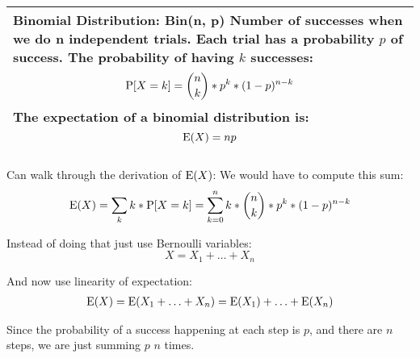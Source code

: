 {\tabulinesep=1mm
\begin{tabu}{|p{16cm} |}
\hline
\vspace{2 mm}
\textbf{Binomial Distribution: Bin(n, p)}
Number of successes when we do n independent trials. Each trial has a 
probability $p$ of success. The probability of having $k$ successes:
\[ \P[X = k] = {n \choose k} * p^k * (1 - p)^{n - k}  \]
The expectation of a binomial distribution is:
\[ \E(X) = np \]
\\
\hline
\end{tabu}
}

\begin{solution} %
Can walk through the derivation of $\E(X)$: 
We would have to compute this sum:
\[\E(X) = \sum_{k} k * \P[X = k] = \sum_{k = 0}^{n} k * {n \choose k} * 
p^k * (1 - p)^{n - k} \]

Instead of doing that just use Bernoulli variables:
\[ X = X_1 + \dotsc + X_n \]

And now use linearity of expectation:
\begin{equation}
\begin{split}
\E(X) = \E(X_1 + \dotsc + X_n) = \E(X_1) + \dotsc + \E(X_n) \nonumber
\end{split}
\end{equation}

Since the probability of a success happening at each step is $p$, and 
there are $n$ steps, we are just summing $p$  $n$ times.
\end{solution}